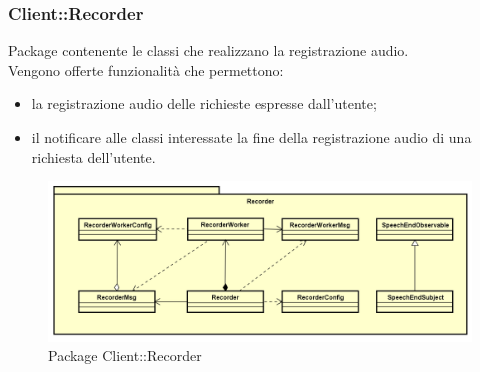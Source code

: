 \subsubsection{Client::Recorder}
Package contenente le classi che realizzano la registrazione audio.\\
Vengono offerte funzionalità che permettono:
\begin{itemize}
\item la registrazione audio delle richieste espresse dall'utente;
\item il notificare alle classi interessate la fine della registrazione audio di una richiesta dell'utente.
\end{itemize}
\begin{figure}[h] \centering \includegraphics[width=\textwidth,height=\textheight,keepaspectratio]{images/diagrams/client/Client/Recorder.png}
	\caption{Package Client::Recorder}
\end{figure}

